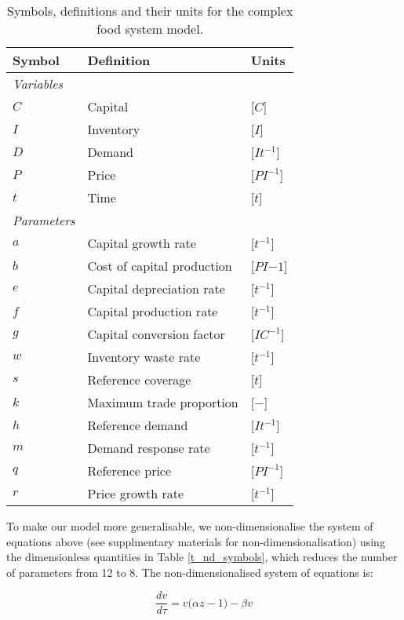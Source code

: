 \documentclass[12pt]{article}
\begin{document}
\begin{table}[t!]
  \centering
  \footnotesize
  \begin{tabular}{p{2cm}p{5cm}p{2cm}}
    \textbf{Symbol} & \textbf{Definition} & \textbf{Units} \\ \hline
    \textit{Variables} &&\\
    $C$    & Capital             & [$C$]\\
    $I$    & Inventory           & [$I$]\\
    $D$    & Demand              & [$It^{-1}$]\\
    $P$    & Price               & [$PI^{-1}$]\\
    $t$    & Time                & [$t$]\\
    \textit{Parameters} &&\\
    $a$    & Capital growth rate & [$t^{-1}$]\\
    $b$    & Cost of capital production & [$PI{-1}$]\\
    $e$    & Capital depreciation rate & [$t^{-1}$]\\
    $f$    & Capital production rate & [$t^{-1}$]\\
    $g$    & Capital conversion factor & [$IC^{-1}$]\\
    $w$    & Inventory waste rate     & [$t^{-1}$]\\
    $s$    & Reference coverage       & [$t$]\\
    $k$    & Maximum trade proportion        & [$-$]\\
    $h$    & Reference demand         & [$It^{-1}$]\\
    $m$    & Demand response rate     & [$t^{-1}$]\\
    $q$    & Reference price          & [$PI^{-1}$]\\
    $r$    & Price growth rate        & [$t^{-1}$]\\\hline
  \end{tabular}
  \caption{Symbols, definitions and their units for the complex food system model.}
  \label{t_symbols}
\end{table}

To make our model more generalisable, we non-dimensionalise the system of equations above (see supplmentary materials for non-dimensionalisation) using the dimensionless quantities in Table \ref{t_nd_symbols}, which reduces the number of parameters from 12 to 8. The non-dimensionalised system of equations is:

\begin{equation}
  \frac{dv}{d\tau} = v \Big(\alpha z - 1\Big) - \beta v
\end{equation}
\end{document}
